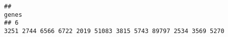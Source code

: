 \documentclass{article}\usepackage[]{graphicx}\usepackage[]{color}
\makeatletter
\newenvironment{kframe}{%
 \def\at@end@of@kframe{}%
 \ifinner\ifhmode%
  \def\at@end@of@kframe{\end{minipage}}%
  \begin{minipage}{\columnwidth}%
 \fi\fi%
 \def\FrameCommand##1{\hskip\@totalleftmargin \hskip-\fboxsep
 \colorbox{shadecolor}{##1}\hskip-\fboxsep
     \hskip-\linewidth \hskip-\@totalleftmargin \hskip\columnwidth}%
 \MakeFramed {\advance\hsize-\width
   \@totalleftmargin\z@ \linewidth\hsize
   \@setminipage}}%
 {\par\unskip\endMakeFramed%
 \at@end@of@kframe}
\newenvironment{knitrout}{}{} %
\makeatother
\begin{document}
\begin{knitrout}
\begin{kframe}
\begin{verbatim}
##                                                                                                                                                                                                                                                                                                                                                                                                                                                                                                                                                                                                                                                                                                                                                                                                                                                                                                                                                                                                                                                                                                                                                                                                                                                                                                                                                                                                                                                           genes
## 6                                                                                                                                                                                                                                                                                                                                                                                                                                                                                                                                                                                                                                                                                                                                                                                                                                                                                                                                                                                                                                                                                                                                                                                                                                                                                                                                                                                                 3251 2744 6566 6722 2019 51083 3815 5743 89797 2534 3569 5270

\end{verbatim}
\end{kframe}
\end{knitrout}
\end{document}
